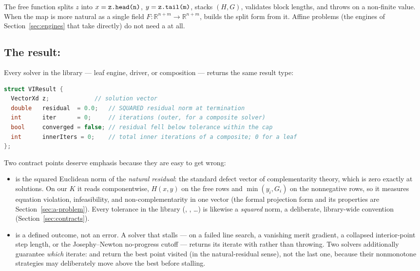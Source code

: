 The free function  splits $z$ into
$x = \texttt{z.head(n)}$, $y = \texttt{z.tail(m)}$, stacks $(H, G)$, validates
block lengths, and throws on a non-finite value. When the map is more natural
as a single field $F:\mathbb{R}^{n+m} \to \mathbb{R}^{n+m}$,
 builds the split form from it. Affine problems
(the engines of Section~\ref{sec:engines} that take  directly)
do not need a  at all.

\subsection{The result: }

Every solver in the library --- leaf engine, driver, or composition ---
returns the same result type:

\begin{lstlisting}[language=C++]
struct VIResult {
  VectorXd z;             // solution vector
  double   residual  = 0.0;   // SQUARED residual norm at termination
  int      iter      = 0;     // iterations (outer, for a composite solver)
  bool     converged = false; // residual fell below tolerance within the cap
  int      innerIters = 0;    // total inner iterations of a composite; 0 for a leaf
};
\end{lstlisting}

Two contract points deserve emphasis because they are easy to get wrong:

\begin{itemize}
\item {} is the squared Euclidean norm of the \emph{natural
  residual}: the standard defect vector of complementarity theory, which is
  zero exactly at solutions. On our $K$ it reads componentwise, $H(x,y)$ on
  the free rows and $\min(y_i, G_i)$ on the nonnegative rows, so it measures
  equation violation, infeasibility, and non-complementarity in one vector
  (the formal projection form and its properties are
  Section~\ref{sec:a-problem}). Every tolerance in the library
  (, , \ldots) is likewise a \emph{squared}
  norm, a deliberate, library-wide convention
  (Section~\ref{sec:contracts}).
\item {} is a defined outcome, not an error. A solver
  that stalls --- on a failed line search, a vanishing merit gradient, a
  collapsed interior-point step length, or the Josephy--Newton no-progress
  cutoff --- returns its iterate with  rather than
  throwing. Two solvers additionally guarantee \emph{which} iterate:
   and  return the
  best point visited (in the natural-residual sense), not the last one,
  because their nonmonotone strategies may deliberately move above the best
  before stalling.
\end{itemize}

